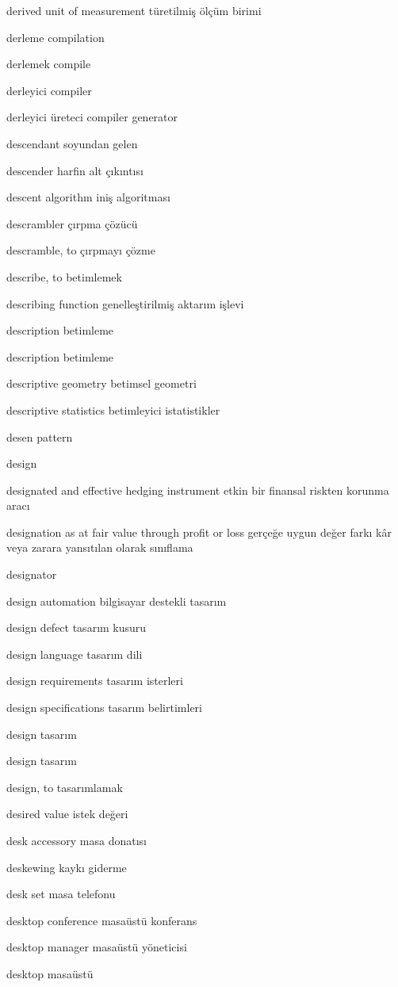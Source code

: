 \documentclass[12pt,fleqn]{article}\usepackage{../../common}
\begin{document}
derived unit of measurement türetilmiş ölçüm birimi

derleme compilation

derlemek compile

derleyici compiler

derleyici üreteci compiler generator

descendant soyundan gelen

descender harfin alt çıkıntısı

descent algorithm iniş algoritması

descrambler çırpma çözücü

descramble, to çırpmayı çözme

describe, to betimlemek

describing function genelleştirilmiş aktarım işlevi

description betimleme

description betimleme

descriptive geometry betimsel geometri

descriptive statistics betimleyici istatistikler

desen pattern

design

designated and effective hedging instrument etkin bir finansal riskten korunma aracı

designation as at fair value through profit or loss gerçeğe uygun değer farkı kâr veya zarara yansıtılan olarak sınıflama

designator

design automation bilgisayar destekli tasarım

design defect tasarım kusuru

design language tasarım dili

design requirements tasarım isterleri

design specifications tasarım belirtimleri

design tasarım

design tasarım

design, to tasarımlamak

desired value istek değeri

desk accessory masa donatısı

deskewing kaykı giderme

desk set masa telefonu

desktop conference masaüstü konferans

desktop manager masaüstü yöneticisi

desktop masaüstü
\end{document}
